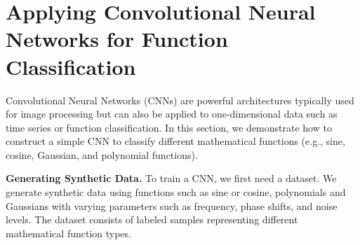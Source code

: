 \section{Applying Convolutional Neural Networks for Function Classification}

Convolutional Neural Networks (CNNs) are powerful architectures typically used for image processing but can also be applied to one-dimensional data such as time series or function classification. In this section, we demonstrate how to construct a simple CNN to classify different mathematical functions (e.g., sine, cosine, Gaussian, and polynomial functions). 

{\bf Generating Synthetic Data.} To train a CNN, we first need a dataset. We generate synthetic data using functions such as sine or cosine, polynomials and Gaussians with varying parameters such as frequency, phase shifts, and noise levels. The dataset consists of labeled samples representing different mathematical function types. 

